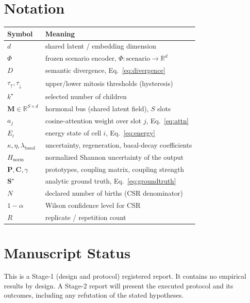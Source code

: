 \documentclass[11pt]{article}
\newcommand{\R}{\mathbb{R}}
\begin{document}
\section{Notation}
\begin{table}[h]
\centering
\small
\begin{tabular}{@{}ll@{}}
\toprule
\textbf{Symbol} & \textbf{Meaning}\\
\midrule
$d$ & shared latent / embedding dimension\\
$\Phi$ & frozen scenario encoder, $\Phi:\text{scenario}\to\R^d$\\
$D$ & semantic divergence, Eq.~\eqref{eq:divergence}\\
$\tau_{\uparrow},\tau_{\downarrow}$ & upper/lower mitosis thresholds (hysteresis)\\
$k^\star$ & selected number of children\\
$\mathbf{M}\in\R^{S\times d}$ & hormonal bus (shared latent field), $S$ slots\\
$a_j$ & cosine-attention weight over slot $j$, Eq.~\eqref{eq:attn}\\
$E_i$ & energy state of cell $i$, Eq.~\eqref{eq:energy}\\
$\kappa,\eta,\lambda_{\text{basal}}$ & uncertainty, regeneration, basal-decay coefficients\\
$H_{\text{norm}}$ & normalized Shannon uncertainty of the output\\
$\mathbf{P},\mathbf{C},\gamma$ & prototypes, coupling matrix, coupling strength\\
$\mathbf{S}^\star$ & analytic ground truth, Eq.~\eqref{eq:groundtruth}\\
$N$ & declared number of births (CSR denominator)\\
$1-\alpha$ & Wilson confidence level for CSR\\
$R$ & replicate / repetition count\\
\bottomrule
\end{tabular}
\end{table}

\section*{Manuscript Status}
\noindent This is a Stage-1 (design and protocol) registered report. It contains
no empirical results by design. A Stage-2 report will present the executed
protocol and its outcomes, including any refutation of the stated hypotheses.
\end{document}
